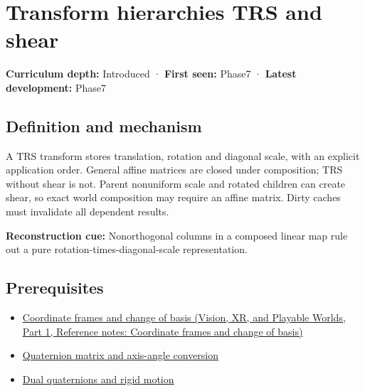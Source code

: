 \hypertarget{appendix-292c061cd47c}{}\label{referencestart:appendix-292c061cd47c}
\section{Transform hierarchies TRS and shear}\label{appendix-292c061cd47c-transform-hierarchies-trs-and-shear}

\hypertarget{appendix-292c061cd47c-transform-hierarchies-trs-and-shear}{}

\textbf{Curriculum depth:} Introduced · \textbf{First seen:} Phase7 · \textbf{Latest development:} Phase7

\begin{allmightroledefinition}

\subsection{Definition and mechanism}\label{appendix-292c061cd47c-definition-and-mechanism}

\hypertarget{appendix-292c061cd47c-definition-and-mechanism}{}

A TRS transform stores translation, rotation and diagonal scale, with an explicit application order. General affine matrices are closed under composition; TRS without shear is not. Parent nonuniform scale and rotated children can create shear, so exact world composition may require an affine matrix. Dirty caches must invalidate all dependent results.

\end{allmightroledefinition}

\textbf{Reconstruction cue:} Nonorthogonal columns in a composed linear map rule out a pure rotation-times-diagonal-scale representation.

\subsection{Prerequisites}\label{appendix-292c061cd47c-prerequisites}

\hypertarget{appendix-292c061cd47c-prerequisites}{}

\begin{itemize}
\tightlist
\item
  \href{../07-Vision-XR-and-Playable-Worlds-P01/main.pdf\#nameddest=appendix-1bae9457dbc3}{Coordinate frames and change of basis (Vision, XR, and Playable Worlds, Part 1, Reference notes: Coordinate frames and change of basis)}
\item
  \hyperref[appendix-26d8da71f6c4]{Quaternion matrix and axis-angle conversion}
\item
  \hyperref[appendix-d1ea57347893]{Dual quaternions and rigid motion}
\end{itemize}

